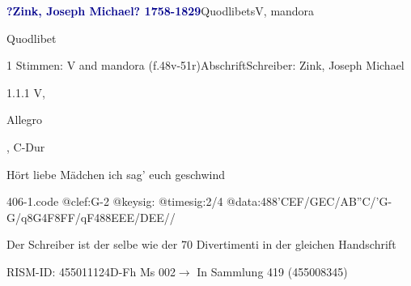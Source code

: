 \documentclass[twocolumn, 12pt]{book}
\begin{document}
\par \vspace{16pt} \textcolor{darkblue}{\textbf{?Zink, Joseph Michael?  1758-1829}}\hfillplus{\textbf{[406]}}\newline Quodlibets\newline V, mandora
\par \begin{itshape}[heading, f.48v:] Quodlibet\end{itshape} 
\par \textcolor{darkblue}{}  1 Stimmen: V and mandora  (f.48v-51r)\newline Abschrift\newline Schreiber: Zink, Joseph Michael
\par 1.1.1  V, \begin{itshape}Allegro\end{itshape}, C-Dur\newline \begin{footnotesize} Hört liebe Mädchen ich sag' euch geschwind \end{footnotesize}  
\begin{filecontents*}{406-1.code}
@clef:G-2
@keysig:
@timesig:2/4
@data:488'CEF/GEC/AB''C/'G-G/q8G4F8FF/qF488EEE/DEE//
\end{filecontents*}
\newline %
\par Der Schreiber ist der selbe wie der 70 Divertimenti in der gleichen Handschrift
\par RISM-ID: 455011124\newline D-Fh  Ms 002\newline $\rightarrow$ In Sammlung 419 (455008345)
      
\end{document}
